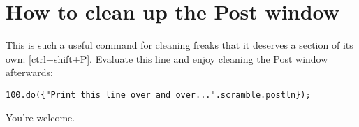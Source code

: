 \section{How to clean up the Post window}

This is such a useful command for cleaning freaks that it deserves a section of its own: [ctrl+shift+P]. Evaluate this line and enjoy cleaning the Post window afterwards:

 
\begin{lstlisting}[style=SuperCollider-IDE, basicstyle=\scttfamily\footnotesize]
100.do({"Print this line over and over...".scramble.postln});
\end{lstlisting}
 
You're welcome.